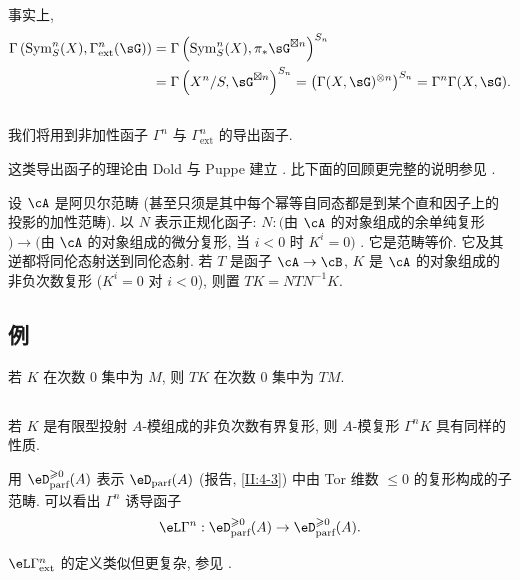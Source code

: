 事实上,
\begin{align*}
  \Gamma\left(\operatorname{Sym}_S^n(X),\Gamma_\text{ext}^n(\sG)\right)
    &= \Gamma\left(\operatorname{Sym}_S^n(X),\pi_*\sG^{\boxtimes n}\right)^{S_n} \\
    &= \Gamma\left(X^n/S,\sG^{\boxtimes n}\right)^{S_n}
    = \left(\Gamma(X,\sG)^{\otimes n}\right)^{S_n}
    = \Gamma^n \Gamma(X,\sG) \text{.}
\end{align*}

\subsection{}\label{III:1-4}

我们将用到非加性函子 $\Gamma^n$ 与 $\Gamma_\text{ext}^n$ 的导出函子.

这类导出函子的理论由 Dold 与 Puppe 建立 \cite{do61}. 比下面的回顾更完整的说明参见 \cite[XVII 5.5.3]{sga4}.

设 $\cA$ 是阿贝尔范畴 (甚至只须是其中每个幂等自同态都是到某个直和因子上的投影的加性范畴). 以 $N$ 表示正规化函子: $N:($由 $\cA$ 的对象组成的余单纯复形$)\to($由 $\cA$ 的对象组成的微分复形, 当 $i<0$ 时 $K^i=0)$ . 它是范畴等价. 它及其逆都将同伦态射送到同伦态射. 若 $T$ 是函子 $\cA\to\cB$, $K$ 是 $\cA$ 的对象组成的非负次数复形 ($K^i=0$ 对 $i<0$), 则置 $T K=N T N^{-1} K$.

\subsection{例}\label{III:1-5}

若 $K$ 在次数 $0$ 集中为 $M$, 则 $T K$ 在次数 $0$ 集中为 $T M$.

\subsection{}\label{III:1-6}

若 $K$ 是有限型投射 $A$-模组成的非负次数有界复形, 则 $A$-模复形 $\Gamma^n K$ 具有同样的性质.

用 $\eD_\text{parf}^{\geqslant 0}(A)$ 表示 $\eD_\text{parf}(A)$ (报告, \ref{II:4-3}) 中由 Tor 维数 $\leqslant 0$ 的复形构成的子范畴. 可以看出 $\Gamma^n$ 诱导函子
\[
  \eL\Gamma^n : \eD_\text{parf}^{\geqslant 0}(A) \to \eD_\text{parf}^{\geqslant 0}(A) \text{.}
\]

$\eL\Gamma_\text{ext}^n$ 的定义类似但更复杂, 参见 \cite[XVII 5.5.14]{sga4}.

\subsection{}\label{III:1-7}

